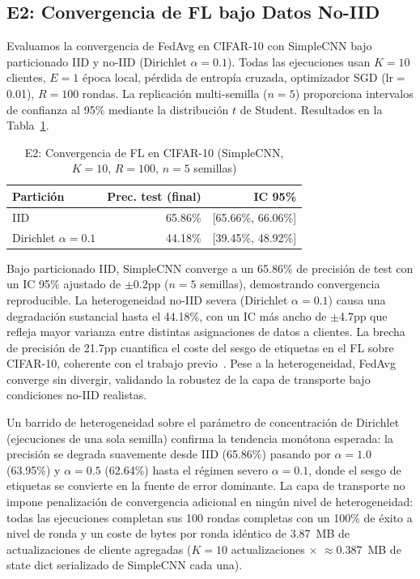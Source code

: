 \documentclass[journal]{IEEEtran}
\begin{document}
\subsection{E2: Convergencia de FL bajo Datos No-IID}
\label{sec:e2}

Evaluamos la convergencia de FedAvg en CIFAR-10 con SimpleCNN bajo particionado IID y no-IID (Dirichlet $\alpha{=}0.1$). Todas las ejecuciones usan $K{=}10$ clientes, $E{=}1$ época local, pérdida de entropía cruzada, optimizador SGD (lr$=$0.01), $R{=}100$ rondas. La replicación multi-semilla ($n{=}5$) proporciona intervalos de confianza al 95\% mediante la distribución $t$ de Student. Resultados en la Tabla~\ref{tab:e2}.

\begin{table}[t]
\centering
\caption{E2: Convergencia de FL en CIFAR-10 (SimpleCNN, $K{=}10$, $R{=}100$, $n{=}5$ semillas)}
\label{tab:e2}
\footnotesize
\begin{tabular}{l r r}
\toprule
\textbf{Partición} & \textbf{Prec. test (final)} & \textbf{IC 95\%} \\
\midrule
IID                  & 65.86\% & [65.66\%, 66.06\%] \\
Dirichlet $\alpha{=}0.1$ & 44.18\% & [39.45\%, 48.92\%] \\
\bottomrule
\end{tabular}
\end{table}

Bajo particionado IID, SimpleCNN converge a un 65.86\% de precisión de test con un IC 95\% ajustado de $\pm$0.2pp ($n{=}5$ semillas), demostrando convergencia reproducible. La heterogeneidad no-IID severa (Dirichlet $\alpha{=}0.1$) causa una degradación sustancial hasta el 44.18\%, con un IC más ancho de $\pm$4.7pp que refleja mayor varianza entre distintas asignaciones de datos a clientes. La brecha de precisión de 21.7pp cuantifica el coste del sesgo de etiquetas en el FL sobre CIFAR-10, coherente con el trabajo previo~\cite{li2020federated,scaffold2020}. Pese a la heterogeneidad, FedAvg converge sin divergir, validando la robustez de la capa de transporte bajo condiciones no-IID realistas.

Un barrido de heterogeneidad sobre el parámetro de concentración de Dirichlet (ejecuciones de una sola semilla) confirma la tendencia monótona esperada: la precisión se degrada suavemente desde IID (65.86\%) pasando por $\alpha{=}1.0$ (63.95\%) y $\alpha{=}0.5$ (62.64\%) hasta el régimen severo $\alpha{=}0.1$, donde el sesgo de etiquetas se convierte en la fuente de error dominante. La capa de transporte no impone penalización de convergencia adicional en ningún nivel de heterogeneidad: todas las ejecuciones completan sus 100 rondas completas con un 100\% de éxito a nivel de ronda y un coste de bytes por ronda idéntico de 3.87~MB de actualizaciones de cliente agregadas ($K{=}10$ actualizaciones $\times$ $\approx$0.387~MB de state dict serializado de SimpleCNN cada una).
\end{document}

